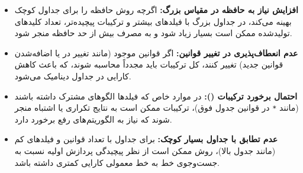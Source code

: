 \begin{enumerate}
\begin{qsolve}
\begin{enumerate}
\begin{itemize}
				\item \textbf{افزایش نیاز به حافظه در مقیاس بزرگ:}
				اگرچه روش  حافظه را برای جداول کوچک بهینه می‌کند، در جداول بزرگ با فیلدهای بیشتر و ترکیبات پیچیده‌تر، تعداد کلیدهای تولیدشده ممکن است بسیار زیاد شود و به مصرف بیش از حد حافظه منجر شود.
				
				\item \textbf{عدم انعطاف‌پذیری در تغییر قوانین:}
				اگر قوانین موجود (مانند تغییر در  یا اضافه‌شدن قوانین جدید) تغییر کنند، کل ترکیبات باید مجدداً محاسبه شوند، که باعث کاهش کارایی در جداول دینامیک می‌شود.
				
				\item \textbf{احتمال برخورد ترکیبات ():}
				در موارد خاص که فیلدها الگوهای مشترک داشته باشند (مانند \texttt{*} در قوانین جدول فوق)، ترکیبات ممکن است به نتایج تکراری یا اشتباه منجر شوند که نیاز به الگوریتم‌های رفع برخورد دارد.
				
				\item \textbf{عدم تطابق با جداول بسیار کوچک:}
				برای جداول با تعداد قوانین و فیلدهای کم (مانند جدول بالا)، روش  ممکن است از نظر پیچیدگی پردازش اولیه نسبت به جست‌وجوی خط به خط معمولی کارایی کمتری داشته باشد.
			\end{itemize}
		\end{enumerate}
	\end{qsolve}
\end{enumerate}